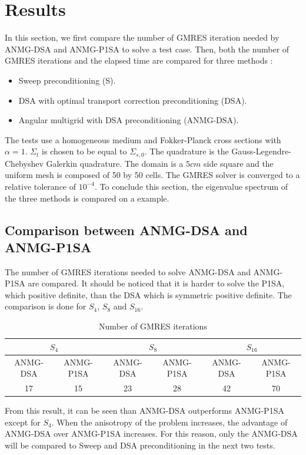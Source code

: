 \section{Results}
In this section, we first compare the number of GMRES iteration needed by 
ANMG-DSA and ANMG-P1SA to solve a test case. Then, both the number of GMRES 
iterations and the elapsed time are compared for three methods :
\begin{itemize}
\item Sweep preconditioning (S).
\item DSA with optimal transport correction preconditioning (DSA).
\item Angular multigrid with DSA preconditioning (ANMG-DSA).
\end{itemize}
The tests use a homogeneous medium and Fokker-Planck cross
sections with $\alpha=1$. $\Sigma_{t}$ is chosen to be equal to
$\Sigma_{s,0}$. The quadrature is the Gauss-Legendre-Chebyshev Galerkin
quadrature. The domain is a $5cm$ side square and the uniform mesh is composed
of 50 by 50 
cells. The GMRES solver is converged to a relative tolerance of $10^{-4}$. To
conclude this section, the eigenvalue spectrum of the three methods is
compared on a example.
\subsection{Comparison between ANMG-DSA and ANMG-P1SA}
The number of GMRES iterations needed to solve ANMG-DSA and
ANMG-P1SA are compared. It should be noticed that it is
harder to solve the P1SA, which positive definite, than the DSA which is
symmetric positive definite. The comparison is done for $S_4$, $S_8$ and
$S_{16}$. 
\begin{table}[H]
\begin{center}
\begin{tabular}{|c|c|c|c|c|c|}
\hline
\multicolumn{2}{|c|}{$S_4$} & \multicolumn{2}{c|}{$S_8$} &
\multicolumn{2}{c|}{$S_{16}$}\\
\hline
ANMG-DSA & ANMG-P1SA & ANMG-DSA & ANMG-P1SA & ANMG-DSA & ANMG-P1SA\\
\hline
17 &  15 & 23 & 28 & 42 & 70\\
\hline
\end{tabular}
\caption{Number of GMRES iterations}
\end{center}
\end{table}
From this result, it can be seen than ANMG-DSA outperforms ANMG-P1SA except for
$S_4$. When the anisotropy of the problem increases, the advantage of ANMG-DSA
over ANMG-P1SA increases. For this reason, only the ANMG-DSA will be compared
to Sweep and DSA preconditioning in the next two tests.
